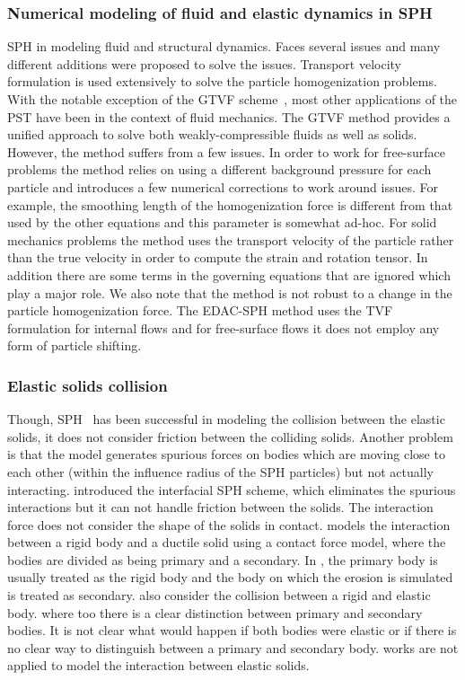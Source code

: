 \subsubsection*{Numerical modeling of fluid and elastic dynamics in SPH}
SPH in modeling fluid and structural dynamics. Faces several issues and many
different additions were proposed to solve the issues. Transport velocity
formulation is used extensively to solve the particle homogenization problems.
With the notable exception of the GTVF scheme~\citep{zhang_hu_adams17}, most
other applications of the PST have been in the context of fluid mechanics. The
GTVF method provides a unified approach to solve both weakly-compressible fluids
as well as solids. However, the method suffers from a few issues. In order to
work for free-surface problems the method relies on using a different background
pressure for each particle and introduces a few numerical corrections to work
around issues. For example, the smoothing length of the homogenization force is
different from that used by the other equations and this parameter is somewhat
ad-hoc. For solid mechanics problems the method uses the transport velocity of
the particle rather than the true velocity in order to compute the strain and
rotation tensor. In addition there are some terms in the governing equations
that are ignored which play a major role. We also note that the method is not
robust to a change in the particle homogenization force. The EDAC-SPH method
uses the TVF formulation for internal flows and for free-surface flows it does
not employ any form of particle shifting.


\subsubsection*{Elastic solids collision}

Though, SPH~\citep{gray2001sph} has been successful in modeling the collision
between the elastic solids, it does not consider friction between the colliding
solids. Another problem is that the model generates spurious forces on bodies
which are moving close to each other (within the influence radius of the SPH
particles) but not actually interacting. \cite{yan2021simulation} introduced the
interfacial SPH scheme, which eliminates the spurious interactions but it can
not handle friction between the solids. The interaction force does not consider
the shape of the solids in contact. \cite{mohseni2021particle} models the
interaction between a rigid body and a ductile solid using a contact force
model, where the bodies are divided as being primary and a secondary. In
\citep{mohseni2021particle}, the primary body is usually treated as the rigid
body and the body on which the erosion is simulated is treated as secondary.
\cite{vyas2021collisional} also consider the collision between a rigid and
elastic body. \cite{vyas2021collisional} where too there is a clear distinction
between primary and secondary bodies. It is not clear what would happen if both
bodies were elastic or if there is no clear way to distinguish between a primary
and secondary body. \cite{vyas2021collisional,mohseni2021particle} works are not
applied to model the interaction between elastic solids.



